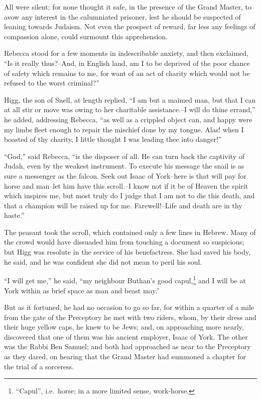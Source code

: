 All were silent; for none thought it safe, in the presence of the Grand
Master, to avow any interest in the calumniated prisoner, lest he should
be suspected of leaning towards Judaism. Not even the prospect of
reward, far less any feelings of compassion alone, could surmount this
apprehension.

Rebecca stood for a few moments in indescribable anxiety, and then
exclaimed, ``Is it really thus?--And, in English land, am I to be
deprived of the poor chance of safety which remains to me, for want of
an act of charity which would not be refused to the worst criminal?''

Higg, the son of Snell, at length replied, ``I am but a maimed man, but
that I can at all stir or move was owing to her charitable
assistance.--I will do thine errand,'' he added, addressing Rebecca,
``as well as a crippled object can, and happy were my limbs fleet enough
to repair the mischief done by my tongue. Alas! when I boasted of thy
charity, I little thought I was leading thee into danger!''

``God,'' said Rebecca, ``is the disposer of all. He can turn back the
captivity of Judah, even by the weakest instrument. To execute his
message the snail is as sure a messenger as the falcon. Seek out Isaac
of York--here is that will pay for horse and man--let him have this
scroll.--I know not if it be of Heaven the spirit which inspires me, but
most truly do I judge that I am not to die this death, and that a
champion will be raised up for me. Farewell!--Life and death are in thy
haste.''

The peasant took the scroll, which contained only a few lines in Hebrew.
Many of the crowd would have dissuaded him from touching a document so
suspicious; but Higg was resolute in the service of his benefactress.
She had saved his body, he said, and he was confident she did not mean
to peril his soul.

``I will get me,'' he said, ``my neighbour Buthan's good
capul,\footnote{``Capul'', i.e.~horse; in a more limited sense,
work-horse.}
and I will be at York within as brief space as man and beast may.''

But as it fortuned, he had no occasion to go so far, for within a
quarter of a mile from the gate of the Preceptory he met with two
riders, whom, by their dress and their huge yellow caps, he knew to be
Jews; and, on approaching more nearly, discovered that one of them was
his ancient employer, Isaac of York. The other was the Rabbi Ben Samuel;
and both had approached as near to the Preceptory as they dared, on
hearing that the Grand Master had summoned a chapter for the trial of a
sorceress.

